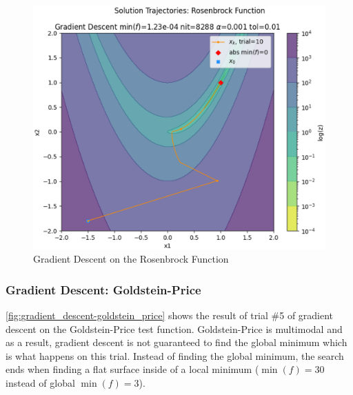 \documentclass{vgtc}                          %
\begin{document}
\begin{figure}[tb]
\centering
\includegraphics[width=\columnwidth]{figures/pictures/images/gradient_descent-rosenbrock-plot2d-10.eps}
\caption{Gradient Descent on the Rosenbrock Function}
\label{fig:gradient_descent-rosenbrock}
\end{figure}

\subsubsection{Gradient Descent: Goldstein-Price}

\autoref{fig:gradient_descent-goldstein_price} shows the result of trial \#5 of gradient descent on the Goldstein-Price test function. Goldstein-Price is multimodal and as a result, gradient descent is not guaranteed to find the global minimum which is what happens on this trial.  Instead of finding the global minimum, the search ends when finding a flat surface inside of a local minimum ($\min(f)=30$ instead of global $\min(f)=3$).
\end{document}
